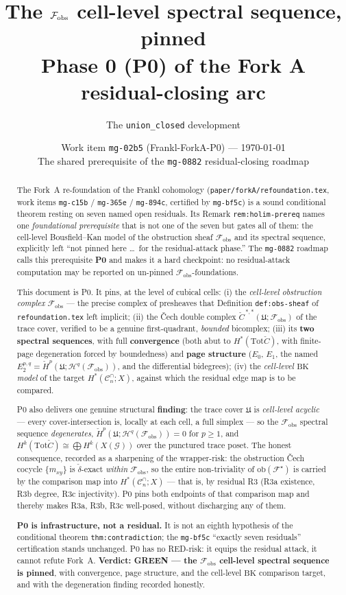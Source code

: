 \documentclass[11pt,oneside]{amsart}
\title[The $\fobs$ cell-level spectral sequence, pinned]{%
  The $\fobs$ cell-level spectral sequence, pinned\\
  \normalsize Phase 0 (P0) of the Fork A residual-closing arc}
\author{The \texttt{union\_closed} development}
\date{Work item \texttt{mg-02b5} (Frankl-ForkA-P0) --- \today\\[2pt]
  \normalfont\small The shared prerequisite of the
  \texttt{mg-0882} residual-closing roadmap}
\theoremstyle{plain}
\theoremstyle{definition}
\theoremstyle{remark}
\theoremstyle{honeststyle}
\newcommand{\F}{\mathcal{F}}
\newcommand{\G}{\mathcal{G}}
\newcommand{\Fstar}{\F^{\star}}
\newcommand{\Cn}{\mathcal{C}^{\cap}_n}
\newcommand{\ob}{\mathrm{ob}}
\newcommand{\BK}{\mathrm{BK}}
\newcommand{\Tot}{\mathrm{Tot}}
\newcommand{\fobs}{\mathcal{F}_{\mathrm{obs}}}
\newcommand{\Uf}{\mathfrak{U}}
\newcommand{\Ccheck}{\check{C}}
\begin{document}
\begin{abstract}
The Fork~A re-foundation of the Frankl cohomology
(\texttt{paper/forkA/refoundation.tex}, work items \texttt{mg-c15b} /
\texttt{mg-365e} / \texttt{mg-894c}, certified by \texttt{mg-bf5c}) is
a sound conditional theorem resting on seven named open residuals.
Its Remark \texttt{rem:holim-prereq} names one \emph{foundational
prerequisite} that is not one of the seven but gates all of them: the
cell-level Bousfield--Kan model of the obstruction sheaf $\fobs$ and
its spectral sequence, explicitly left ``not pinned here \dots\ for the
residual-attack phase.'' The \texttt{mg-0882} roadmap calls this
prerequisite \textbf{P0} and makes it a hard checkpoint: no
residual-attack computation may be reported on un-pinned
$\fobs$-foundations.

This document is P0. It pins, at the level of cubical cells: (i) the
\emph{cell-level obstruction complex} $\fobs$ --- the precise complex
of presheaves that Definition \texttt{def:obs-sheaf} of
\texttt{refoundation.tex} left implicit; (ii) the \v{C}ech double
complex $\Ccheck^{\,*,*}(\Uf;\fobs)$ of the trace cover, verified to be
a genuine first-quadrant, \emph{bounded} bicomplex; (iii) its
\textbf{two spectral sequences}, with full \textbf{convergence} (both
abut to $H^{*}(\Tot\Ccheck)$, with finite-page degeneration forced by
boundedness) and \textbf{page structure} ($E_{0}$, $E_{1}$, the named
$E_{2}^{p,q}=\check H^{p}(\Uf;\mathcal H^{q}(\fobs))$, and the
differential bidegrees); (iv) the \emph{cell-level $\BK$ model} of the
target $H^{*}(\Cn;X)$, against which the residual edge map is to be
compared.

P0 also delivers one genuine structural \textbf{finding}: the trace
cover $\Uf$ is \emph{cell-level acyclic} --- every cover-intersection
is, locally at each cell, a full simplex --- so the $\fobs$ spectral
sequence \emph{degenerates}, $\check H^{p}(\Uf;\mathcal
H^{q}(\fobs))=0$ for $p\ge1$, and $H^{k}(\Tot\Ccheck)\cong\bigoplus
H^{k}(X(\G))$ over the punctured trace poset. The honest consequence,
recorded as a sharpening of the wrapper-risk: the obstruction
\v{C}ech cocycle $\{m_{xy}\}$ is $\check\delta$-exact \emph{within}
$\fobs$, so the entire non-triviality of $\ob(\Fstar)$ is carried by
the comparison map into $H^{*}(\Cn;X)$ --- that is, by residual R3
(R3a existence, R3b degree, R3c injectivity). P0 pins both endpoints
of that comparison map and thereby makes R3a, R3b, R3c well-posed,
without discharging any of them.

\textbf{P0 is infrastructure, not a residual.} It is not an eighth
hypothesis of the conditional theorem \texttt{thm:contradiction}; the
\texttt{mg-bf5c} ``exactly seven residuals'' certification stands
unchanged. P0 has no RED-risk: it equips the residual attack, it
cannot refute Fork~A. \textbf{Verdict: GREEN --- the $\fobs$
cell-level spectral sequence is pinned}, with convergence, page
structure, and the cell-level $\BK$ comparison target, and with the
degeneration finding recorded honestly.
\end{abstract}
\end{document}
